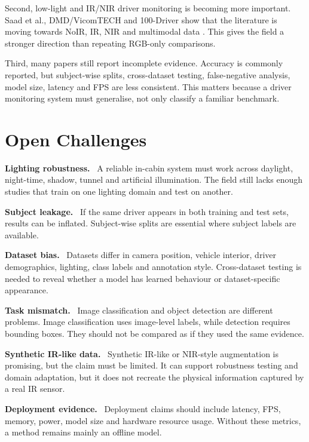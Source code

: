 \documentclass[11pt,a4paper]{article}
\let\oldsection\section
\renewcommand{\section}{\FloatBarrier\Needspace{9\baselineskip}\oldsection}
\newcommand{\focuspara}[1]{\par\medskip\noindent\textbf{#1.}\ }
\begin{document}
Second, low-light and IR/NIR driver monitoring is becoming more important. Saad et al., DMD/VicomTECH and 100-Driver show that the literature is moving towards NoIR, IR, NIR and multimodal data \parencite{saad2020lowlight,ortega2020dmd,wang2023hundreddriver}. This gives the field a stronger direction than repeating RGB-only comparisons.

Third, many papers still report incomplete evidence. Accuracy is commonly reported, but subject-wise splits, cross-dataset testing, false-negative analysis, model size, latency and FPS are less consistent. This matters because a driver monitoring system must generalise, not only classify a familiar benchmark.

\section{Open Challenges}

\focuspara{Lighting robustness}
A reliable in-cabin system must work across daylight, night-time, shadow, tunnel and artificial illumination. The field still lacks enough studies that train on one lighting domain and test on another.

\focuspara{Subject leakage}
If the same driver appears in both training and test sets, results can be inflated. Subject-wise splits are essential where subject labels are available.

\focuspara{Dataset bias}
Datasets differ in camera position, vehicle interior, driver demographics, lighting, class labels and annotation style. Cross-dataset testing is needed to reveal whether a model has learned behaviour or dataset-specific appearance.

\focuspara{Task mismatch}
Image classification and object detection are different problems. Image classification uses image-level labels, while detection requires bounding boxes. They should not be compared as if they used the same evidence.

\focuspara{Synthetic IR-like data}
Synthetic IR-like or NIR-style augmentation is promising, but the claim must be limited. It can support robustness testing and domain adaptation, but it does not recreate the physical information captured by a real IR sensor.

\focuspara{Deployment evidence}
Deployment claims should include latency, FPS, memory, power, model size and hardware resource usage. Without these metrics, a method remains mainly an offline model.
\end{document}
